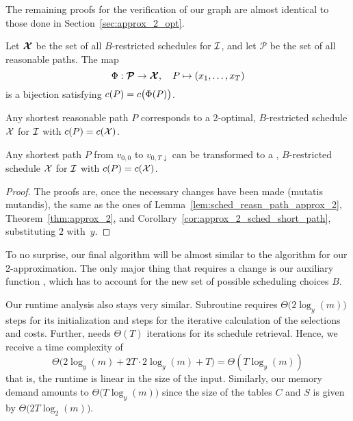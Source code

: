 The remaining proofs for the verification of our graph are almost identical to those done in Section~\ref{sec:approx_2_opt}.
\begin{lem}\label{lem:sched_reasn_path_approx_y}
Let $\bm{\mathcal{X}}$ be the set of all $B$-restricted schedules for $\mathcal{I}$, and let $\bm{\mathcal{P}}$ be the set of all reasonable paths. The map
\begin{equation*}
	\Phi:\bm{\mathcal{P}}\rightarrow\bm{\mathcal{X}},\quad P\mapsto (x_1,\dotsc,x_T)
\end{equation*}
is a bijection satisfying $c(P)=c\bigl(\Phi(P)\bigr)$.
\end{lem}
\begin{thm}\label{thm:approx_y}
Any shortest reasonable path $P$ corresponds to a 2-optimal, $B$-restricted schedule $\mathcal{X}$ for $\mathcal{I}$ with $c(P)=c(\mathcal{X})$.
\end{thm} 
\begin{cor}
Any shortest path $P$ from $v_{0,0}$ to $v_{0,T\downarrow}$ can be transformed to a , $B$-restricted schedule $\mathcal{X}$ for $\mathcal{I}$ with $c(P)=c(\mathcal{X})$.
\end{cor}
\begin{proof}
The proofs are, once the necessary changes have been made (mutatis mutandis), the same as the ones of Lemma~\ref{lem:sched_reasn_path_approx_2}, Theorem~\ref{thm:approx_2}, and Corollary~\ref{cor:approx_2_sched_short_path}, substituting $2$ with~$y$.
\end{proof}
To no surprise, our final algorithm will be almost similar to the algorithm for our 2-approximation. The only major thing that requires a change is our auxiliary function , which has to account for the new set of possible scheduling choices $B$.

Our runtime analysis also stays very similar. Subroutine  requires $\Theta\bigl(2\log_y(m)\bigr)$ steps for its initialization and  steps for the iterative calculation of the selections and costs. Further,  needs $\Theta(T)$ iterations for its schedule retrieval. Hence, we receive a time complexity of
\begin{equation*}
	\Theta\bigl(2\log_y(m)+2T\cdot2\log_y(m)+T\bigr)=\Theta(T\log_y(m))
\end{equation*}
that is, the runtime is linear in the size of the input. Similarly, our memory demand amounts to $\Theta\bigl(T\log_y(m)\bigr)$ since the size of the tables $C$ and $S$ is given by $\Theta\bigl(2T\log_2(m)\bigr)$.

